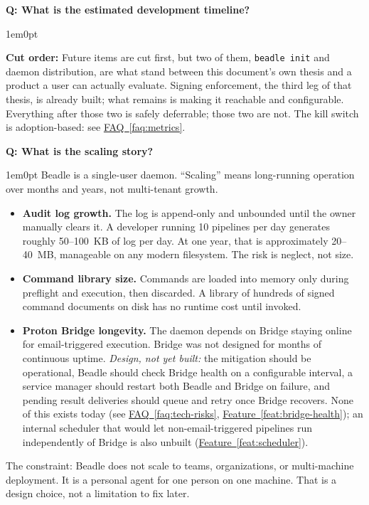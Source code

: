 \documentclass[11pt,letterpaper]{article}
\newcounter{faqnum}
\newenvironment{faqpair}[1]{%
  \needspace{4\baselineskip}%
  \vspace{0.5em}%
  \refstepcounter{faqnum}%
  \noindent\textbf{\color{SectionBlue}Q\thefaqnum: #1}\par\nopagebreak[4]%
  \vspace{0.2em}%
  \begin{adjustwidth}{1em}{0pt}%
  \setlength{\parindent}{0pt}%
}{%
  \end{adjustwidth}%
  \vspace{0.5em}%
}
\newcommand{\faqref}[1]{\hyperref[#1]{FAQ~\ref*{#1}}}
\newcommand{\featureref}[1]{\hyperref[#1]{Feature~\ref*{#1}}}
\begin{document}
\begin{faqpair}{What is the estimated development timeline?}
  \textbf{Cut order:} Future items are cut first, but two of them,
  {\small\texttt{beadle init}} and daemon distribution, are what stand
  between this document's own thesis and a product a user can actually
  evaluate. Signing enforcement, the third leg of that thesis, is already
  built; what remains is making it reachable and configurable. Everything
  after those two is safely deferrable; those two are not. The kill switch
  is adoption-based: see \faqref{faq:metrics}.
\end{faqpair}

\begin{faqpair}{What is the scaling story?}\label{faq:scaling}
  Beadle is a single-user daemon. ``Scaling'' means long-running operation over
  months and years, not multi-tenant growth.

  \begin{itemize}[nosep]
    \item \textbf{Audit log growth.} The log is append-only and unbounded until
      the owner manually clears it. A developer running 10 pipelines per day
      generates roughly 50--100~KB of log per day. At one year, that is
      approximately 20--40~MB, manageable on any modern filesystem. The risk
      is neglect, not size.
    \item \textbf{Command library size.} Commands are loaded into memory only
      during preflight and execution, then discarded. A library of hundreds of
      signed command documents on disk has no runtime cost until invoked.
    \item \textbf{Proton Bridge longevity.} The daemon depends on Bridge staying
      online for email-triggered execution. Bridge was not designed for months
      of continuous uptime. \textit{Design, not yet built:} the mitigation
      should be operational, Beadle should check Bridge health on a
      configurable interval, a service manager should restart both Beadle
      and Bridge on failure, and pending result deliveries should queue and
      retry once Bridge recovers. None of this exists today (see
      \faqref{faq:tech-risks}, \featureref{feat:bridge-health}); an
      internal scheduler that would let non-email-triggered pipelines run
      independently of Bridge is also unbuilt (\featureref{feat:scheduler}).
  \end{itemize}

  The constraint: Beadle does not scale to teams, organizations, or
  multi-machine deployment. It is a personal agent for one person on one
  machine. That is a design choice, not a limitation to fix later.
\end{faqpair}
\end{document}
